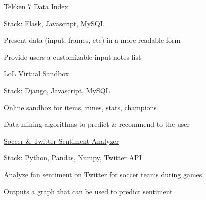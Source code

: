 

\begin{cventries}

  \cventrynoposition
    {\href{https://github.com/basulaib/TekkenProject}{Tekken 7 Data Index}} %
    {
      \begin{cvitems} %
        \item {Stack: Flask, Javascript, MySQL}
        \item {Present data (input, frames, etc) in a more readable form}
        \item {Provide users a customizable input notes list}
      \end{cvitems}
    }
    
  \cventrynoposition
    {\href{https://github.com/basulaib/LoLSandbox}{LoL Virtual Sandbox}} %
    {
      \begin{cvitems} %
        \item {Stack: Django, Javascript, MySQL}
        \item {Online sandbox for items, runes, stats, champions}
        \item {Data mining algorithms to predict \& recommend to the user}
      \end{cvitems}
    }

  \cventrynoposition
    {\href{https://github.com/basulaib/SoccerTwitter-Sentiment}{Soccer \& Twitter Sentiment Analyzer}} %
    {
      \begin{cvitems} %
        \item {Stack: Python, Pandas, Numpy, Twitter API}
        \item {Analyze fan sentiment on Twitter for soccer teams during games}
        \item {Outputs a graph that can be used to predict sentiment}
      \end{cvitems}
    }
    


\end{cventries}
